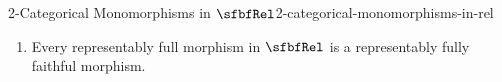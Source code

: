 \begin{proposition}{2-Categorical Monomorphisms in $\sfbfRel$}{2-categorical-monomorphisms-in-rel}
\begin{enumerate}
\begin{enumerate}
                \item\label{2-categorical-monomorphisms-in-rel-representably-full-morphisms-in-rel-5}The functor
                    \[
                        R_{*}%
                        \colon%
                        (\mathcal{P}(A),\subset)%
                        \to%
                        (\mathcal{P}(B),\subset)%
                    \]%
                    is full.
                \item\label{2-categorical-monomorphisms-in-rel-representably-full-morphisms-in-rel-6}For each $U,V\in\mathcal{P}(A)$, if $R_{*}(U)\subset R_{*}(V)$, then $U\subset V$.
            \end{enumerate}
        \item\label{2-categorical-monomorphisms-in-rel-representably-fully-faithful-morphisms-in-rel}Every representably full morphism in $\sfbfRel$ is a representably fully faithful morphism.
    \end{enumerate}
\end{proposition}
